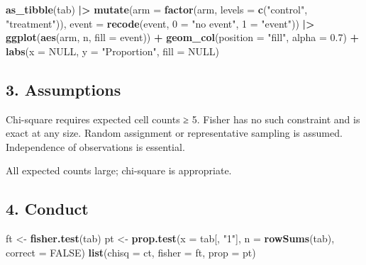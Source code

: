 \documentclass[
]{article}
\newenvironment{Shaded}{\begin{snugshade}}{\end{snugshade}}
\newcommand{\AttributeTok}[1]{\textcolor[rgb]{0.13,0.29,0.53}{#1}}
\newcommand{\ConstantTok}[1]{\textcolor[rgb]{0.56,0.35,0.01}{#1}}
\newcommand{\FloatTok}[1]{\textcolor[rgb]{0.00,0.00,0.81}{#1}}
\newcommand{\FunctionTok}[1]{\textcolor[rgb]{0.13,0.29,0.53}{\textbf{#1}}}
\newcommand{\NormalTok}[1]{#1}
\newcommand{\OtherTok}[1]{\textcolor[rgb]{0.56,0.35,0.01}{#1}}
\newcommand{\SpecialCharTok}[1]{\textcolor[rgb]{0.81,0.36,0.00}{\textbf{#1}}}
\newcommand{\StringTok}[1]{\textcolor[rgb]{0.31,0.60,0.02}{#1}}
\begin{document}
\begin{Shaded}
\begin{Highlighting}[]
\FunctionTok{as\_tibble}\NormalTok{(tab) }\SpecialCharTok{|\textgreater{}}
  \FunctionTok{mutate}\NormalTok{(}\AttributeTok{arm =} \FunctionTok{factor}\NormalTok{(arm, }\AttributeTok{levels =} \FunctionTok{c}\NormalTok{(}\StringTok{"control"}\NormalTok{, }\StringTok{"treatment"}\NormalTok{)),}
         \AttributeTok{event =} \FunctionTok{recode}\NormalTok{(event, }\StringTok{\textasciigrave{}}\AttributeTok{0}\StringTok{\textasciigrave{}} \OtherTok{=} \StringTok{"no event"}\NormalTok{, }\StringTok{\textasciigrave{}}\AttributeTok{1}\StringTok{\textasciigrave{}} \OtherTok{=} \StringTok{"event"}\NormalTok{)) }\SpecialCharTok{|\textgreater{}}
  \FunctionTok{ggplot}\NormalTok{(}\FunctionTok{aes}\NormalTok{(arm, n, }\AttributeTok{fill =}\NormalTok{ event)) }\SpecialCharTok{+}
  \FunctionTok{geom\_col}\NormalTok{(}\AttributeTok{position =} \StringTok{"fill"}\NormalTok{, }\AttributeTok{alpha =} \FloatTok{0.7}\NormalTok{) }\SpecialCharTok{+}
  \FunctionTok{labs}\NormalTok{(}\AttributeTok{x =} \ConstantTok{NULL}\NormalTok{, }\AttributeTok{y =} \StringTok{"Proportion"}\NormalTok{, }\AttributeTok{fill =} \ConstantTok{NULL}\NormalTok{)}
\end{Highlighting}
\end{Shaded}

\subsection{3. Assumptions}\label{assumptions}

Chi-square requires expected cell counts ≥ 5. Fisher has no such
constraint and is exact at any size. Random assignment or representative
sampling is assumed. Independence of observations is essential.

\begin{Shaded}
\begin{Highlighting}[]

\end{Highlighting}
\end{Shaded}

All expected counts large; chi-square is appropriate.

\subsection{4. Conduct}\label{conduct}

\begin{Shaded}
\begin{Highlighting}[]
\NormalTok{ft }\OtherTok{\textless{}{-}} \FunctionTok{fisher.test}\NormalTok{(tab)}
\NormalTok{pt }\OtherTok{\textless{}{-}} \FunctionTok{prop.test}\NormalTok{(}\AttributeTok{x =}\NormalTok{ tab[, }\StringTok{"1"}\NormalTok{], }\AttributeTok{n =} \FunctionTok{rowSums}\NormalTok{(tab), }\AttributeTok{correct =} \ConstantTok{FALSE}\NormalTok{)}
\FunctionTok{list}\NormalTok{(}\AttributeTok{chisq =}\NormalTok{ ct, }\AttributeTok{fisher =}\NormalTok{ ft, }\AttributeTok{prop =}\NormalTok{ pt)}
\end{Highlighting}
\end{Shaded}
\end{document}
